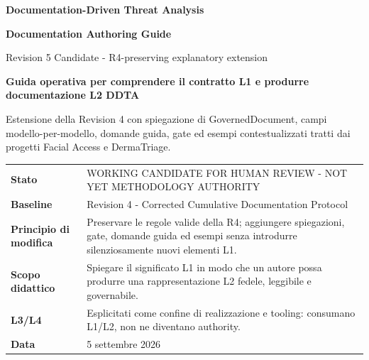 \documentclass[11pt,a4paper]{article}
\begin{document}

\begin{titlepage}
\thispagestyle{empty}
\vspace*{8mm}

{\sffamily\bfseries\color{DDTANavy}\fontsize{15}{18}\selectfont Documentation-Driven Threat Analysis}\par
\vspace{5mm}
{\sffamily\bfseries\color{DDTANavy}\fontsize{30}{34}\selectfont Documentation Authoring Guide}\par
\vspace{2mm}
{\sffamily\color{DDTABlue}\fontsize{19}{23}\selectfont Revision 5 Candidate - R4-preserving explanatory extension}\par

\vspace{10mm}
\begin{tcolorbox}[enhanced,arc=3pt,boxrule=0pt,colback=DDTANavy,left=12pt,right=12pt,top=11pt,bottom=11pt]
{\color{white}\sffamily\bfseries\large Guida operativa per comprendere il contratto L1 e produrre documentazione L2 DDTA}\par
\vspace{2mm}
{\color{white!88}\small Estensione della Revision 4 con spiegazione di GovernedDocument, campi modello-per-modello, domande guida, gate ed esempi contestualizzati tratti dai progetti Facial Access e DermaTriage.}
\end{tcolorbox}

\vspace{8mm}
\begin{tabularx}{\textwidth}{L{42mm}Y}
\toprule
\textbf{Stato} & WORKING CANDIDATE FOR HUMAN REVIEW - NOT YET METHODOLOGY AUTHORITY \\
\textbf{Baseline} & Revision 4 - Corrected Cumulative Documentation Protocol \\
\textbf{Principio di modifica} & Preservare le regole valide della R4; aggiungere spiegazioni, gate, domande guida ed esempi senza introdurre silenziosamente nuovi elementi L1. \\
\textbf{Scopo didattico} & Spiegare il significato L1 in modo che un autore possa produrre una rappresentazione L2 fedele, leggibile e governabile. \\
\textbf{L3/L4} & Esplicitati come confine di realizzazione e tooling: consumano L1/L2, non ne diventano authority. \\
\textbf{Data} & 5 settembre 2026 \\
\bottomrule
\end{tabularx}


\end{titlepage}
\end{document}
